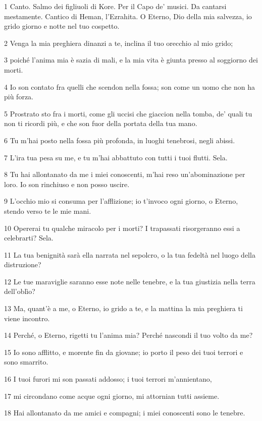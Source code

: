 \par 1 Canto. Salmo dei figliuoli di Kore. Per il Capo de' musici. Da cantarsi mestamente. Cantico di Heman, l'Ezrahita. O Eterno, Dio della mia salvezza, io grido giorno e notte nel tuo cospetto.
\par 2 Venga la mia preghiera dinanzi a te, inclina il tuo orecchio al mio grido;
\par 3 poiché l'anima mia è sazia di mali, e la mia vita è giunta presso al soggiorno dei morti.
\par 4 Io son contato fra quelli che scendon nella fossa; son come un uomo che non ha più forza.
\par 5 Prostrato sto fra i morti, come gli uccisi che giaccion nella tomba, de' quali tu non ti ricordi più, e che son fuor della portata della tua mano.
\par 6 Tu m'hai posto nella fossa più profonda, in luoghi tenebrosi, negli abissi.
\par 7 L'ira tua pesa su me, e tu m'hai abbattuto con tutti i tuoi flutti. Sela.
\par 8 Tu hai allontanato da me i miei conoscenti, m'hai reso un'abominazione per loro. Io son rinchiuso e non posso uscire.
\par 9 L'occhio mio si consuma per l'afflizione; io t'invoco ogni giorno, o Eterno, stendo verso te le mie mani.
\par 10 Opererai tu qualche miracolo per i morti? I trapassati risorgeranno essi a celebrarti? Sela.
\par 11 La tua benignità sarà ella narrata nel sepolcro, o la tua fedeltà nel luogo della distruzione?
\par 12 Le tue maraviglie saranno esse note nelle tenebre, e la tua giustizia nella terra dell'oblìo?
\par 13 Ma, quant'è a me, o Eterno, io grido a te, e la mattina la mia preghiera ti viene incontro.
\par 14 Perché, o Eterno, rigetti tu l'anima mia? Perché nascondi il tuo volto da me?
\par 15 Io sono afflitto, e morente fin da giovane; io porto il peso dei tuoi terrori e sono smarrito.
\par 16 I tuoi furori mi son passati addosso; i tuoi terrori m'annientano,
\par 17 mi circondano come acque ogni giorno, mi attornian tutti assieme.
\par 18 Hai allontanato da me amici e compagni; i miei conoscenti sono le tenebre.

